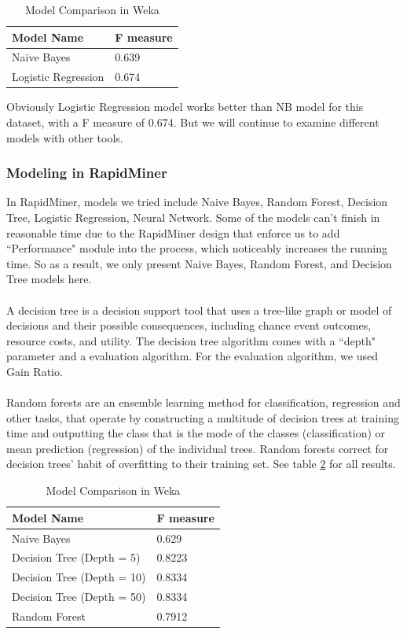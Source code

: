 \documentclass[CEJM,PDF]{cej} %
\begin{document}
\begin{table}[h]
\centering
\caption{Model Comparison in Weka}
\label{weka-model}
\begin{tabular}{@{}|l|l|@{}}
\toprule
\hline
Model Name  & F measure \\ \midrule
\hline
Naive Bayes & 0.639   \\
\hline
Logistic Regression  & 0.674 \\ \bottomrule
\hline
\end{tabular}
\end{table}

Obviously Logistic Regression model works better than NB model for this dataset, with a F measure of 0.674. But we will continue to examine different models with other tools.\\

\subsubsection{Modeling in RapidMiner}
In RapidMiner, models we tried include Naive Bayes, Random Forest, Decision Tree, Logistic Regression, Neural Network. Some of the models can't finish in reasonable time due to the RapidMiner design that enforce us to add ``Performance" module into the process, which noticeably increases the running time. So as a result, we only present Naive Bayes, Random Forest, and Decision Tree models here. \\
\\
A decision tree is a decision support tool that uses a tree-like graph or model of decisions and their possible consequences, including chance event outcomes, resource costs, and utility. The decision tree algorithm comes with a ``depth" parameter and a evaluation algorithm. For the evaluation algorithm, we used Gain Ratio.\\
\\
Random forests are an ensemble learning method for classification, regression and other tasks, that operate by constructing a multitude of decision trees at training time and outputting the class that is the mode of the classes (classification) or mean prediction (regression) of the individual trees. Random forests correct for decision trees' habit of overfitting to their training set. See table \ref{rm-model} for all results.\\ 

\begin{table}[h]
\centering
\caption{Model Comparison in Weka}
\label{rm-model}
\begin{tabular}{@{}|l|l|@{}}
\toprule
\hline
Model Name  & F measure \\ \midrule
\hline
Naive Bayes & 0.629   \\
\hline
Decision Tree (Depth = 5) & 0.8223\\
\hline
Decision Tree (Depth = 10) & 0.8334 \\
\hline
Decision Tree (Depth = 50) & 0.8334 \\
\hline
Random Forest & 0.7912 \\ \bottomrule
\hline
\end{tabular}
\end{table}
\end{document}
